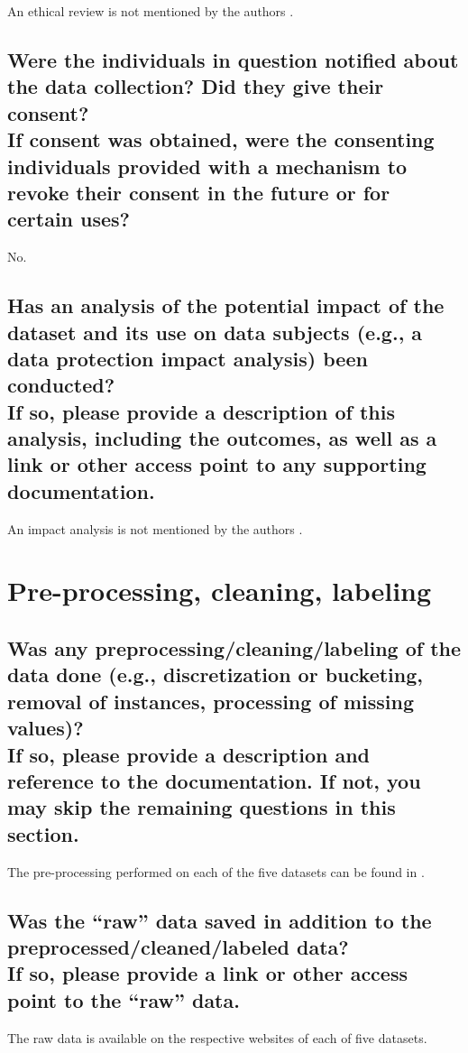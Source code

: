 \documentclass[letterpaper, 10 pt, conference]{ieeeconf}  %
\newcommand{\subtitle}[1]{{\\ \small \normalfont \color{purple} #1}}
\begin{document}
An ethical review is not mentioned by the authors \cite{ciocanel2020justfair}.

\subsection{Were the individuals in question notified about the data collection? Did they give their consent? \subtitle{If consent was obtained, were the consenting individuals provided with a mechanism to revoke their consent in the future or for certain uses?}}

No.

\subsection{Has an analysis of the potential impact of the dataset and its use on data subjects (e.g., a data protection impact analysis) been conducted? \subtitle{If so, please provide a description of this analysis, including the outcomes, as well as a link or other access point to any supporting documentation.}}

An impact analysis is not mentioned by the authors \cite{ciocanel2020justfair}.

\section{Pre-processing, cleaning, labeling}

\subsection{Was any preprocessing/cleaning/labeling of the data done (e.g., discretization or bucketing, removal of instances, processing of missing values)? \subtitle{If so, please provide a description and reference to the documentation. If not, you may skip the remaining questions in this section.}}

The pre-processing performed on each of the five datasets can be found in \cite{ciocanel2020justfair}.

\subsection{Was the “raw” data saved in addition to the preprocessed/cleaned/labeled data? \subtitle{If so, please provide a link or other access point to the “raw” data. }}

The raw data is available on the respective websites of each of five datasets.
\end{document}

